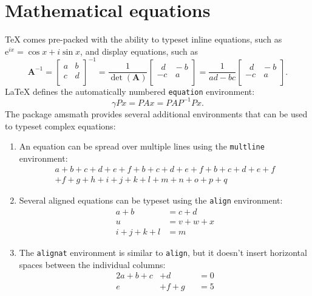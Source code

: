 \documentclass[
  digital, %
  table,   %
%
  lof,     %
  lot,     %
]{fithesis3}
\begin{document}
{\chapter{Mathematical equations}
\label{chap:matheq}
\TeX{} comes pre-packed with the ability to typeset inline
equations, such as $\mathrm{e}^{ix}=\cos x+i\sin x$, and display
equations, such as \[
  \mathbf{A}^{-1} = \begin{bmatrix}
  a & b \\ c & d \\
  \end{bmatrix}^{-1} =
  \frac{1}{\det(\mathbf{A})} \begin{bmatrix}
  \,\,\,d & \!\!-b \\ -c & \,a \\
  \end{bmatrix} =
  \frac{1}{ad - bc} \begin{bmatrix}
  \,\,\,d & \!\!-b \\ -c & \,a \\
  \end{bmatrix}.
\] \LaTeX{} defines the automatically numbered \texttt{equation}
environment:
\begin{equation}
  \gamma Px = PAx = PAP^{-1}Px.
\end{equation}
The package \textsf{amsmath} provides several additional
environments that can be used to typeset complex equations:
\begin{enumerate}
  \item An equation can be spread over multiple lines using the
    \texttt{multline} environment:
    \begin{multline}
      a + b + c + d + e + f + b + c + d + e + f + b + c + d + e +
f \\
      + f + g + h + i + j + k + l + m + n + o + p + q
    \end{multline}

  \item Several aligned equations can be typeset using the
    \texttt{align} environment:
    \begin{align}
              a + b &= c + d     \\
                  u &= v + w + x \\[1ex]
      i + j + k + l &= m
    \end{align}

  \item The \texttt{alignat} environment is similar to
    \texttt{align}, but it doesn't insert horizontal spaces between
    the individual columns:
    \begin{alignat}{2}
      a + b + c &+ d       &   &= 0 \\
              e &+ f + g   &   &= 5
    \end{alignat}


\end{enumerate}}
\end{document}
